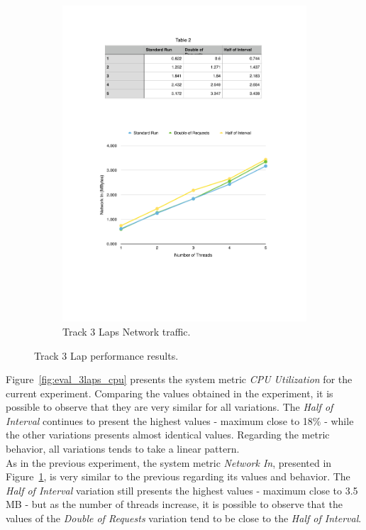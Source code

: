 \begin{figure}[ht!]
\begin{subfigure}{.5\textwidth}
  \includegraphics[width=\linewidth]{./images/network_3_lap}
  \caption{Track 3 Laps Network traffic.}
  \label{fig:eval_3laps_network}
\end{subfigure}
\caption{Track 3 Lap performance results.}
\label{fig:eval_3laps_results}
\end{figure}

Figure~\ref{fig:eval_3laps_cpu} presents the system metric \textit{CPU Utilization} for the current
experiment. Comparing the values obtained in the experiment, it is possible to observe that
they are very similar for all variations. The \textit{Half of Interval} continues to present
the highest values - maximum close to 18$\%$ - while the other variations presents almost identical
values. Regarding the metric behavior, all variations tends to take a linear pattern.\\

As in the previous experiment, the system metric \textit{Network In}, presented in Figure~\ref{fig:eval_3laps_network},
is very similar to the previous regarding its values and behavior. The \textit{Half of Interval}
variation still presents the highest values - maximum close to 3.5 \gls{MB} - but as the number of
threads increase, it is possible to observe that the values of the \textit{Double of Requests}
variation tend to be close to the \textit{Half of Interval}.

